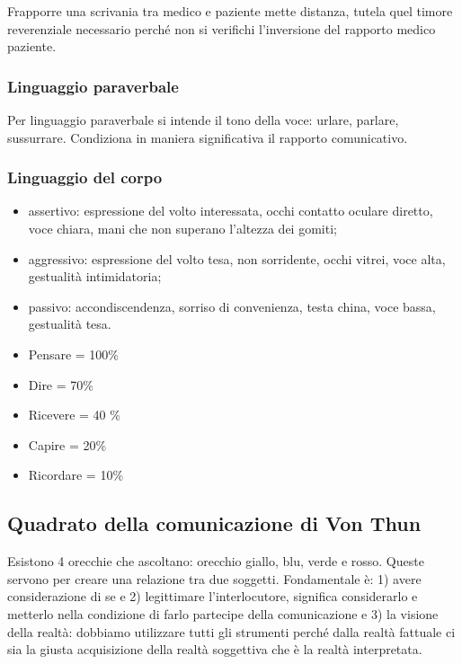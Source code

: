 Frapporre una scrivania tra medico e paziente mette distanza, tutela
quel timore reverenziale necessario perché non si verifichi l'inversione
del rapporto medico paziente.

\subsubsection{Linguaggio paraverbale}

Per linguaggio paraverbale si intende il tono della voce: urlare,
parlare, sussurrare. Condiziona in maniera significativa il rapporto
comunicativo.

\subsubsection{Linguaggio del corpo}

\begin{itemize}
\item
  assertivo: espressione del volto interessata, occhi contatto oculare
  diretto, voce chiara, mani che non superano l'altezza dei gomiti;
\item
  aggressivo: espressione del volto tesa, non sorridente, occhi vitrei,
  voce alta, gestualità intimidatoria;
\item
  passivo: accondiscendenza, sorriso di convenienza, testa china, voce
  bassa, gestualità tesa.
\end{itemize}

\begin{itemize}
\item
  Pensare = 100\%
\item
  Dire = 70\%
\item
  Ricevere = 40 \%
\item
  Capire = 20\%
\item
  Ricordare = 10\%
\end{itemize}

\subsection{Quadrato della comunicazione di Von Thun}

Esistono 4 orecchie che ascoltano: orecchio giallo, blu, verde e rosso.
Queste servono per creare una relazione tra due soggetti. Fondamentale
è: 1) avere considerazione di se e 2) legittimare l'interlocutore,
significa considerarlo e metterlo nella condizione di farlo partecipe
della comunicazione e 3) la visione della realtà: dobbiamo utilizzare
tutti gli strumenti perché dalla realtà fattuale ci sia la giusta
acquisizione della realtà soggettiva che è la realtà interpretata.

